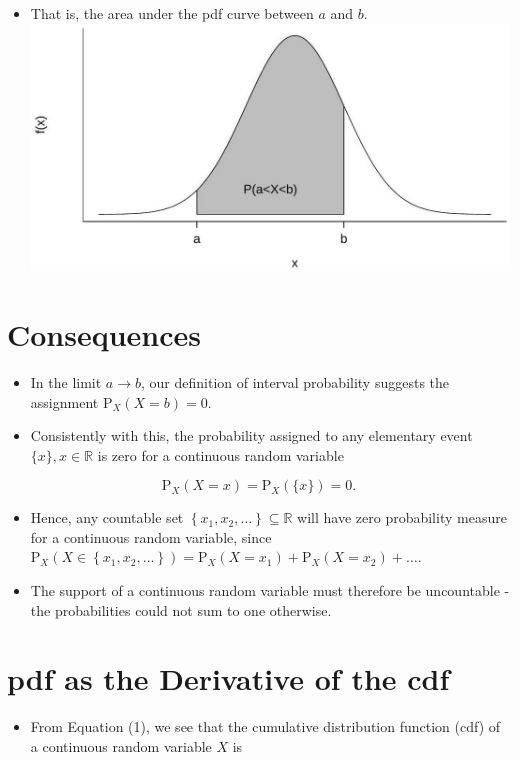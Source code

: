 \documentclass[10pt]{article}
\begin{document}
\begin{itemize}
  \item That is, the area under the pdf curve between $a$ and $b$.\\
\includegraphics[max width=\textwidth, center]{2025_05_11_1201cfe24e14b364b4ecg-05}
\end{itemize}

\section*{Consequences}
\begin{itemize}
  \item In the limit $a \rightarrow b$, our definition of interval probability suggests the assignment $\mathrm{P}_{X}(X=b)=0$.
  \item Consistently with this, the probability assigned to any elementary event $\{x\}, x \in \mathbb{R}$ is zero for a continuous random variable
\end{itemize}

$$
\mathrm{P}_{X}(X=x)=\mathrm{P}_{X}(\{x\})=0 .
$$

\begin{itemize}
  \item Hence, any countable set $\left\{x_{1}, x_{2}, \ldots\right\} \subseteq \mathbb{R}$ will have zero probability measure for a continuous random variable, since $\mathrm{P}_{X}\left(X \in\left\{x_{1}, x_{2}, \ldots\right\}\right)=\mathrm{P}_{X}\left(X=x_{1}\right)+\mathrm{P}_{X}\left(X=x_{2}\right)+\ldots$.
  \item The support of a continuous random variable must therefore be uncountable - the probabilities could not sum to one otherwise.
\end{itemize}

\section*{pdf as the Derivative of the cdf}
\begin{itemize}
  \item From Equation (1), we see that the cumulative distribution function (cdf) of a continuous random variable $X$ is
\end{itemize}
\end{document}
